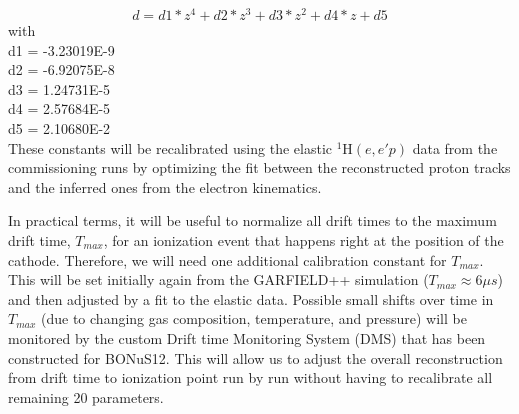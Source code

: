 \documentclass[12pt]{article}
\begin{document}
\begin{equation}
d = d1 * z^4 + d2 * z^3 + d3 *z^2 + d4 * z + d5
\end{equation}
with\\
d1 = -3.23019E-9\\
d2 = -6.92075E-8\\
d3 = 1.24731E-5\\
d4 = 2.57684E-5\\
d5 = 2.10680E-2\\

 
These constants
will be recalibrated using the elastic 
      $^1$H$(e,e'p)$  data from the commissioning runs by optimizing the fit between 
the reconstructed proton tracks and the inferred ones from the electron kinematics.

In practical terms, it will be useful to normalize all drift times to the maximum drift time,
$T_{max}$, for an ionization event that happens right at the position of the cathode. Therefore,
we will need one additional calibration constant for $T_{max}$. This will be set
initially again from the GARFIELD++ simulation ($T_{max} \approx 6 \mu s$) and then 
adjusted by a fit to the elastic data. Possible small shifts over time in  $T_{max}$ 
(due to changing gas composition, temperature, and pressure) will be monitored
by the custom Drift time Monitoring System (DMS) that has been constructed for BONuS12.
This will allow us to adjust the overall reconstruction from drift time to ionization point run by run
without having to recalibrate all remaining 20 parameters.
\end{document}
